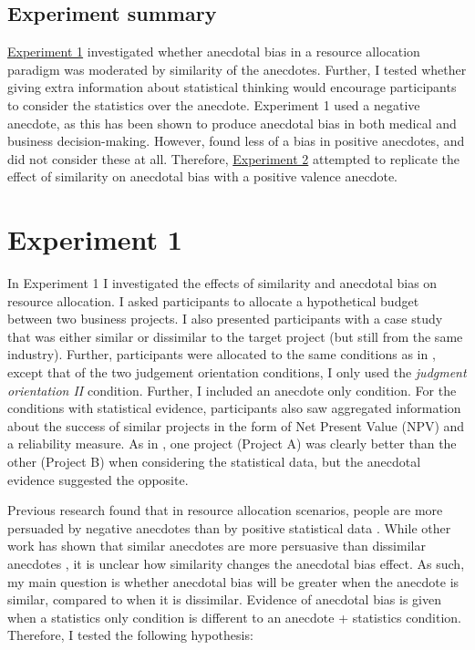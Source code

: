 \documentclass[a4paper, nobind, dvipsnames]{templates/ociamthesis}
\theoremstyle{definition}
\theoremstyle{definition}
\theoremstyle{definition}
\theoremstyle{definition}
\theoremstyle{remark}
\begin{document}
\subsection{Experiment summary}

\protect\hyperlink{anecdotes-1}{Experiment 1} investigated whether anecdotal bias in a resource
allocation paradigm was moderated by similarity of the anecdotes. Further, I
tested whether giving extra information about statistical thinking would
encourage participants to consider the statistics over the anecdote. Experiment
1 used a negative anecdote, as this has been shown to produce anecdotal bias in
both medical \autocite{jaramillo2019} and business \autocite{wainberg2018} decision-making.
However, \textcite{jaramillo2019} found less of a bias in positive anecdotes, and
\textcite{wainberg2018} did not consider these at all. Therefore, \protect\hyperlink{anecdotes-2}{Experiment
2} attempted to replicate the effect of similarity on anecdotal
bias with a positive valence anecdote.

\hypertarget{anecdotes-1}{%
\section{Experiment 1}\label{anecdotes-1}}

In Experiment 1 I investigated the effects of similarity and anecdotal bias on
resource allocation. I asked participants to allocate a hypothetical budget
between two business projects. I also presented participants with a case study
that was either similar or dissimilar to the target project (but still from the
same industry). Further, participants were allocated to the same conditions as
in \textcite{wainberg2018}, except that of the two judgement orientation conditions, I
only used the \emph{judgment orientation II} condition. Further, I included an
anecdote only condition. For the conditions with statistical evidence,
participants also saw aggregated information about the success of similar
projects in the form of Net Present Value (NPV) and a reliability measure. As in
\textcite{wainberg2018}, one project (Project A) was clearly better than the other
(Project B) when considering the statistical data, but the anecdotal evidence
suggested the opposite.

Previous research found that in resource allocation scenarios, people are more
persuaded by negative anecdotes than by positive statistical data
\autocite{wainberg2018}. While other work has shown that similar anecdotes are more
persuasive than dissimilar anecdotes \autocite[Study 3]{hoeken2009}, it is unclear how
similarity changes the anecdotal bias effect. As such, my main question is
whether anecdotal bias will be greater when the anecdote is similar, compared to
when it is dissimilar. Evidence of anecdotal bias is given when a statistics
only condition is different to an anecdote + statistics condition. Therefore, I
tested the following hypothesis:
\end{document}
